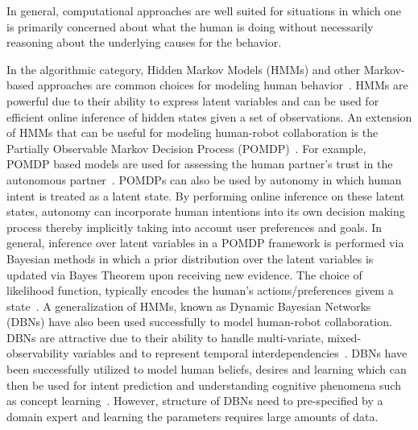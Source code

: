 \documentclass[12pt]{article}
\newcommand{\DGc}[1]{{\textbf{\color{blue}{#1}}}}
\begin{document}

In general, computational approaches are well suited for situations in which one is primarily concerned about what the human is doing without necessarily reasoning about the underlying causes for the behavior. 

In the algorithmic category, Hidden Markov Models (HMMs) and other Markov-based approaches are common choices for modeling human behavior~\cite{kelley2008understanding}. HMMs are powerful due to their ability to express latent variables and can be used for efficient online inference of hidden states given a set of observations. An extension of HMMs that can be useful for modeling human-robot collaboration is the Partially Observable Markov Decision Process (POMDP)~\cite{taha2011pomdp}. For example, POMDP based models are used for assessing the human partner's trust in the autonomous partner~\cite{chen2018planning}. 
POMDPs can also be used by autonomy in which human intent is treated as a latent state. By performing online inference on these latent states, autonomy can incorporate human intentions into its own decision making process thereby implicitly taking into account user preferences and goals. In general, inference over latent variables in a POMDP framework is performed via Bayesian methods in which a prior distribution over the latent variables is updated via Bayes Theorem upon receiving new evidence. The choice of likelihood function, typically encodes the human's actions/preferences givem a state~\cite{dragan2012formalizing}. 
A generalization of HMMs, known as Dynamic Bayesian Networks (DBNs) have also been used successfully to model human-robot collaboration. DBNs are attractive due to their ability to handle multi-variate, mixed-observability variables and to represent temporal interdependencies~\cite{murphy2002dynamic}. DBNs have been successfully utilized to model human beliefs, desires and learning which can then be used for intent prediction and understanding cognitive phenomena such as concept learning~\cite{tahboub2006intelligent}. However, structure of DBNs need to pre-specified by a domain expert and learning the parameters requires large amounts of data. 
\end{document}
